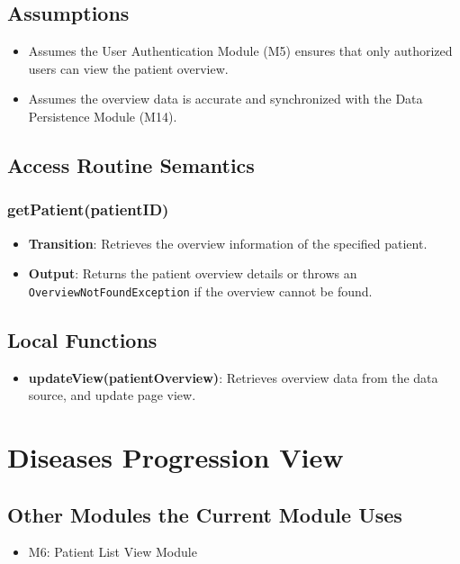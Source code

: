 \documentclass[12pt, titlepage]{article}
\begin{document}
\subsection{Assumptions}
\begin{itemize}
\item Assumes the User Authentication Module (M5) ensures that only authorized users can view the patient overview.
\item Assumes the overview data is accurate and synchronized with the Data Persistence Module (M14).
\end{itemize}

\subsection{Access Routine Semantics}
\subsubsection{getPatient(patientID)}
\begin{itemize}
    \item \textbf{Transition}: Retrieves the overview information of the specified patient.
    \item \textbf{Output}: Returns the patient overview details or throws an \texttt{OverviewNotFoundException} if the overview cannot be found.
\end{itemize}

\subsection{Local Functions}

\newpage
\begin{itemize}
\item \textbf{updateView(patientOverview)}: Retrieves overview data from the data source, and update page view.
\end{itemize}
\section{Diseases Progression View}

\subsection{Other Modules the Current Module Uses}
\begin{itemize}
  \item M6: Patient List View Module
\end{itemize}
\end{document}
